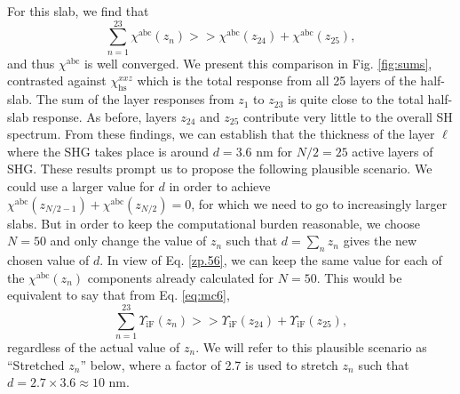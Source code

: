 \documentclass[utf8]{frontiersSCNS}
\begin{document}
For this slab, we find that
\begin{equation}\label{zp.56}
\sum_{n=1}^{23}\chi^{\mathrm{abc}}(z_{n}) 
>> \chi^{\mathrm{abc}}(z_{24})+\chi^{\mathrm{abc}}(z_{25}),
\end{equation} 
and thus $\chi^{\mathrm{abc}}$ is well converged.
{\color{red}
We present this comparison in Fig. \ref{fig:sums}, contrasted against
$\chi^{xxz}_{\mathrm{hs}}$ which is the total response from all 25 layers of the
half-slab. The sum of the layer responses from $z_{1}$ to $z_{23}$ is quite
close to the total half-slab response. As before, layers $z_{24}$ and $z_{25}$
contribute very little to the overall SH spectrum.
}%
From these findings, we can establish that the thickness of the layer $\ell$
where the SHG takes place is around $d = 3.6$ nm for $N/2 = 25$ active layers of
SHG. These results prompt us to propose the following plausible scenario. We
could use a larger value for $d$ in order to achieve
$\chi^{\mathrm{abc}}(z_{N/2-1}) + \chi^{\mathrm{abc}}(z_{N/2}) = 0$, for which
we need to go to increasingly larger slabs. But in order to keep the
computational burden reasonable, we choose $N = 50$ and only change the value of
$z_{n}$ such that $d = \sum_{n} z_{n}$ gives the new chosen value of $d$. In
view of Eq. \eqref{zp.56}, we can keep the same value for each of the
$\chi^{\mathrm{abc}}(z_{n})$ components already calculated for $N = 50$. This
would be equivalent to say that from Eq. \eqref{eq:mc6},
\begin{equation}\label{zp.57}
\sum_{n=1}^{23}\Upsilon_{\mathrm{iF}}(z_{n}) 
>>\Upsilon_{\mathrm{iF}}(z_{24}) +\Upsilon_{\mathrm{iF}}(z_{25}),
\end{equation}  
regardless of the actual value of $z_{n}$. We will refer to this plausible
scenario as ``Stretched $z_{n}$'' below, where a factor of 2.7 is used to stretch $z_{n}$ such that $d = 2.7 \times 3.6 \approx 10$ nm.
\end{document}
